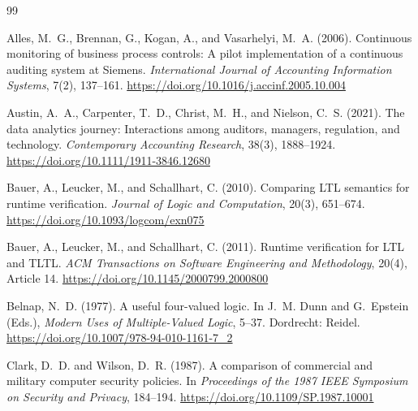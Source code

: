 \documentclass[smallcondensed,envcountsect,natbib]{svjour3}
\begin{document}
\begin{thebibliography}{99}

Alles, M.~G., Brennan, G., Kogan, A., and Vasarhelyi, M.~A. (2006).
Continuous monitoring of business process controls: A pilot implementation of a continuous auditing system at Siemens.
\emph{International Journal of Accounting Information Systems}, 7(2), 137--161. \url{https://doi.org/10.1016/j.accinf.2005.10.004}

Austin, A.~A., Carpenter, T.~D., Christ, M.~H., and Nielson, C.~S. (2021).
The data analytics journey: Interactions among auditors, managers, regulation, and technology.
\emph{Contemporary Accounting Research}, 38(3), 1888--1924. \url{https://doi.org/10.1111/1911-3846.12680}

Bauer, A., Leucker, M., and Schallhart, C. (2010).
Comparing LTL semantics for runtime verification.
\emph{Journal of Logic and Computation}, 20(3), 651--674. \url{https://doi.org/10.1093/logcom/exn075}

Bauer, A., Leucker, M., and Schallhart, C. (2011).
Runtime verification for LTL and TLTL.
\emph{ACM Transactions on Software Engineering and Methodology}, 20(4), Article 14. \url{https://doi.org/10.1145/2000799.2000800}


Belnap, N.~D. (1977).
A useful four-valued logic.
In J.~M. Dunn and G.~Epstein (Eds.), \emph{Modern Uses of Multiple-Valued Logic}, 5--37. Dordrecht: Reidel. \url{https://doi.org/10.1007/978-94-010-1161-7_2}

Clark, D.~D. and Wilson, D.~R. (1987).
A comparison of commercial and military computer security policies.
In \emph{Proceedings of the 1987 IEEE Symposium on Security and Privacy}, 184--194. \url{https://doi.org/10.1109/SP.1987.10001}


\end{thebibliography}
\end{document}
